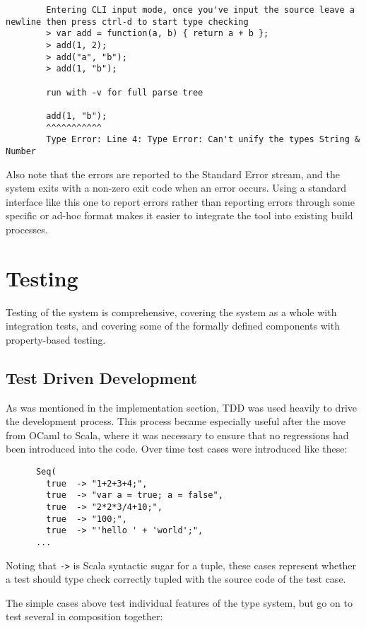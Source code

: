 \documentclass[british, twoside]{bhamthesis}
\theoremstyle{definition}
\begin{document}
      \begin{lstlisting}
        Entering CLI input mode, once you've input the source leave a newline then press ctrl-d to start type checking
        > var add = function(a, b) { return a + b };
        > add(1, 2);
        > add("a", "b");
        > add(1, "b");
        
        run with -v for full parse tree

        add(1, "b");
        ^^^^^^^^^^^
        Type Error: Line 4: Type Error: Can't unify the types String & Number
      \end{lstlisting}

      Also note that the errors are reported to the Standard Error stream, and the system exits with a non-zero exit code when an error occurs. Using a standard interface like this one to report errors rather than reporting errors through some specific or ad-hoc format makes it easier to integrate the tool into existing build processes.

\chapter{Testing}
  Testing of the system is comprehensive, covering the system as a whole with integration tests, and covering some of the formally defined components with property-based testing.

  \section{Test Driven Development}
    As was mentioned in the implementation section, TDD was used heavily to drive the development process. This process became especially useful after the move from OCaml to Scala, where it was necessary to ensure that no regressions had been introduced into the code. Over time test cases were introduced like these:

    \begin{lstlisting}
      Seq(
        true  -> "1+2+3+4;",
        true  -> "var a = true; a = false",
        true  -> "2*2*3/4+10;",
        true  -> "100;",
        true  -> "'hello ' + 'world';",
      ...
    \end{lstlisting}

    Noting that \texttt{->} is Scala syntactic sugar for a tuple, these cases represent whether a test should type check correctly tupled with the source code of the test case.

    The simple cases above test individual features of the type system, but go on to test several in composition together:
\end{document}

